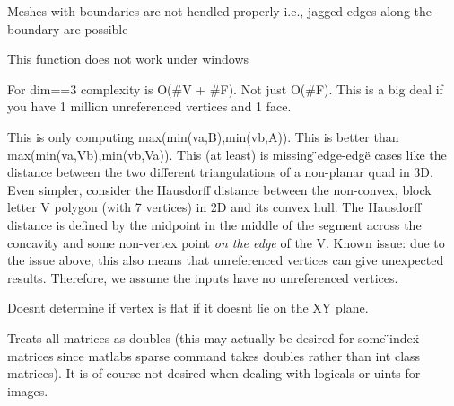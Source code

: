 \begin{DoxyRefList}
Meshes with boundaries are not hendled properly i.\+e., jagged edges along the boundary are possible  
\item[Member \doxylink{namespaceigl_a73748b03f3e779d764d30d920653aba6}{igl\+::dated\+\_\+copy} (const std\+::string \&src\+\_\+path, const std\+::string \&dir)]\label{bug__bug000004}%
%
This function does not work under windows  
\item[Member \doxylink{namespaceigl_a7bae61a0f8a1bbe72e7832381c9beca5}{igl\+::doublearea} (const Eigen\+::\+Matrix\+Base$<$ Derived\+V $>$ \&V, const Eigen\+::\+Matrix\+Base$<$ Derived\+F $>$ \&F, Eigen\+::\+Plain\+Object\+Base$<$ Deriveddbl\+A $>$ \&dblA)]\label{bug__bug000005}%
%
For dim==3 complexity is O(\#V + \#F). Not just O(\#F). This is a big deal if you have 1 million unreferenced vertices and 1 face.  
\item[Member \doxylink{namespaceigl_a64901d7f496bd1cccbccceddbc091603}{igl\+::hausdorff} (const Eigen\+::\+Matrix\+Base$<$ Derived\+VA $>$ \&VA, const Eigen\+::\+Matrix\+Base$<$ Derived\+FA $>$ \&FA, const Eigen\+::\+Matrix\+Base$<$ Derived\+VB $>$ \&VB, const Eigen\+::\+Matrix\+Base$<$ Derived\+FB $>$ \&FB, Scalar \&d)]\label{bug__bug000006}%
%
This is only computing max(min(va,\+B),min(vb,\+A)). This is better than max(min(va,\+Vb),min(vb,\+Va)). This (at least) is missing \"{}edge-\/edge\"{} cases like the distance between the two different triangulations of a non-\/planar quad in 3D. Even simpler, consider the Hausdorff distance between the non-\/convex, block letter V polygon (with 7 vertices) in 2D and its convex hull. The Hausdorff distance is defined by the midpoint in the middle of the segment across the concavity and some non-\/vertex point {\itshape on the edge} of the V. Known issue\+: due to the issue above, this also means that unreferenced vertices can give unexpected results. Therefore, we assume the inputs have no unreferenced vertices. 
\item[Member \doxylink{namespaceigl_aedd09a46e564a0d19ae4f97891b95de9}{igl\+::is\+\_\+planar} (const Eigen\+::\+Matrix\+Xd \&V)]\label{bug__bug000007}%
%
Doesn\textquotesingle{}t determine if vertex is flat if it doesn\textquotesingle{}t lie on the XY plane.  
\item[Class \doxylink{classigl_1_1matlab_1_1MatlabWorkspace}{igl\+::matlab\+::Matlab\+Workspace} ]\label{bug__bug000008}%
%
Treats all matrices as doubles (this may actually be desired for some \"{}index\"{} matrices since matlab\textquotesingle{}s sparse command takes doubles rather than int class matrices). It is of course not desired when dealing with logicals or uint\textquotesingle{}s for images.  

\end{DoxyRefList}
